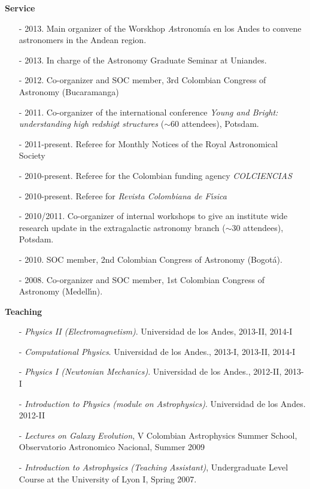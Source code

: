 \documentclass[9pt]{article}
\begin{document}
{\bf Service}
\begin{itemize}
\item[-] 2013. Main organizer of the Worskhop {\textit Astronom\'ia en
  los Andes} to convene astronomers in the Andean region.  
\item[-] 2013. In charge of the Astronomy Graduate Seminar at
  Uniandes. 
\item[-] 2012. Co-organizer and SOC member, 3rd Colombian Congress of
  Astronomy (Bucaramanga) 
\item[-] 2011. Co-organizer of the international conference {\it Young
  and Bright: understanding high redshigt structures} ($\sim 60$
  attendees), Potsdam. 
\item[-] 2011-present. Referee for Monthly Notices of the Royal
  Astronomical Society %
\item[-] 2010-present. Referee for the Colombian funding agency {\it
  COLCIENCIAS} %
\item[-] 2010-present. Referee for {\it Revista Colombiana de
  F\'{\i}sica} %
\item[-] 2010/2011. Co-organizer of internal workshops to give an
  institute wide research update in the extragalactic astronomy branch
  ($\sim 30$ attendees), Potsdam. 
\item[-] 2010. SOC member, 2nd Colombian Congress of Astronomy (Bogot\'a).
\item[-] 2008. Co-organizer and SOC member, 1st Colombian Congress of
  Astronomy (Medell\'{\i}n). 
\end{itemize}

{\bf Teaching}
\begin{itemize}
\item[-] {\it Physics II (Electromagnetism)}. Universidad de
  los Andes, 2013-II, 2014-I
\item[-] {\it Computational Physics}. Universidad de los
  Andes., 2013-I, 2013-II, 2014-I
\item[-] {\it Physics I (Newtonian Mechanics)}. Universidad
  de los Andes., 2012-II, 2013-I
\item[-] {\it Introduction to Physics (module on
  Astrophysics)}. Universidad de los Andes.  2012-II
\item[-]{\it Lectures on Galaxy Evolution}, V Colombian
  Astrophysics Summer School, Observatorio Astronomico Nacional, Summer 2009
\item[-]{\it{Introduction to Astrophysics (Teaching
      Assistant)}}, Undergraduate Level Course at the University of Lyon I,
      Spring 2007.
\end{itemize}
\end{document}

